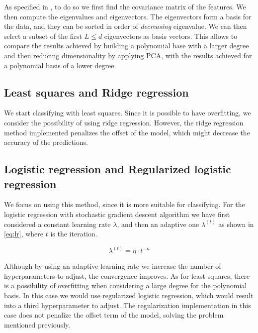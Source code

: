 \documentclass[10pt,conference,compsocconf]{IEEEtran}
\begin{document}
  	As specified in \cite{smith02}, to do so we first find the covariance matrix of the features. We then compute the eigenvalues and eigenvectors. The eigenvectors form a basis for the data, and they can be sorted in order of \emph{decreasing} eigenvalue. We can then select a subset of the first $L\leq d$ eigenvectors as basis vectors. This allows to compare the results achieved by building a polynomial base with a larger degree and then reducing dimensionality by applying PCA, with the results achieved for a polynomial basis of a lower degree.

	\subsection{Least squares and Ridge regression} %
	\label{sub:least_squares_and_ridge_regression}
  	We start classifying with least squares. Since it is possible to have overfitting, we consider the possibility of using ridge regression. However, the ridge regression method implemented penalizes the offset of the model, which might decrease the accuracy of the predictions.

	\subsection{Logistic regression and Regularized logistic regression} %
	\label{sub:logistic_regression_and_regularized_logistic_regression}
  	We focus on using this method, since it is more suitable for classifying. For the logistic regression with stochastic gradient descent algorithm we have first considered a constant learning rate $\lambda$, and then an adaptive one $\lambda^{(t)}$ as shown in \ref{eq:lr}, where $t$ is the iteration.

  	\begin{equation}
    	\label{eq:lr}
      	\lambda^{(t)} = \eta \cdot t ^{- \kappa}
  	\end{equation}

  	Although by using an adaptive learning rate we increase the number of hyperparameters to adjust, the convergence improves.
  	As for least squares, there is a possibility of overfitting when considering a large degree for the polynomial basis. In this case we would use regularized logistic regression, which would result into a third hyperparameter to adjust. The regularization implementation in this case does not penalize the offset term of the model, solving the problem mentioned previously.
\end{document}
